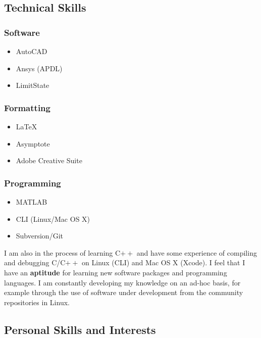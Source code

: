 \documentclass[oneside,a4paper]{article}
\begin{document}
\subsection*{Technical Skills}
\begin{multicols}{3}

\subsubsection*{Software}
\begin{itemize}
\item AutoCAD
\item Ansys (APDL)
\item LimitState
\end{itemize}

\subsubsection*{Formatting}
\begin{itemize}
\item \LaTeX
\item Asymptote
\item Adobe Creative Suite
\end{itemize}

\subsubsection*{Programming}
\begin{itemize}
\item MATLAB
\item CLI (Linux/Mac OS X)
\item Subversion/Git
\end{itemize}

\end{multicols}

I am also in the process of learning C$++$ and have some experience of compiling and debugging C/C$++$ on Linux (CLI) and Mac OS X (Xcode). I feel that I have an {\bf aptitude} for learning new software packages and programming languages. I am constantly developing my knowledge on an ad-hoc basis, for example  through the use of software under development from the community repositories in Linux.

\subsection*{Personal Skills and Interests}
\end{document}
